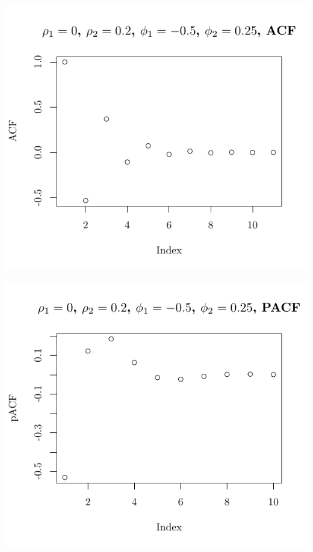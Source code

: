 \documentclass[10pt]{paper}\usepackage[]{graphicx}\usepackage[]{color}
\makeatletter
\def\maxwidth{ %
  \ifdim\Gin@nat@width>\linewidth
    \linewidth
  \else
    \Gin@nat@width
  \fi
}
\newenvironment{knitrout}{}{} %
\makeatother
\begin{document}
\begin{knitrout}
{\centering \includegraphics[width=\maxwidth]{figure/graphics-plotter-83} 

}




{\centering \includegraphics[width=\maxwidth]{figure/graphics-plotter-84} 

}





\end{knitrout}
\end{document}
